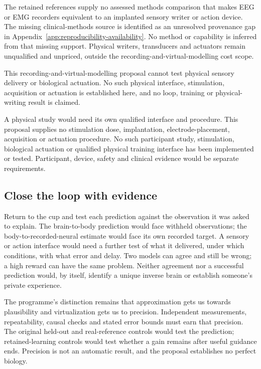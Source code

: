 The retained references supply no assessed methods comparison that makes EEG or EMG recorders equivalent to an implanted sensory writer or action device. The missing clinical-methods source is identified as an unresolved provenance gap in Appendix~\ref{app:reproducibility-availability}. No method or capability is inferred from that missing support. Physical writers, transducers and actuators remain unqualified and unpriced, outside the recording-and-virtual-modelling cost scope.

This recording-and-virtual-modelling proposal cannot test physical sensory
delivery or biological actuation. No such physical interface, stimulation,
acquisition or actuation is established here, and no loop, training or
physical-writing result is claimed.

A physical study would need its own qualified interface and procedure. This
proposal supplies no stimulation dose, implantation, electrode-placement,
acquisition or actuation procedure. No such participant study, stimulation, biological actuation or qualified physical training interface has been implemented or tested. Participant, device, safety and clinical evidence would be separate requirements.

\subsection{Close the loop with evidence}
Return to the cup and test each prediction against the observation it was
asked to explain. The brain-to-body prediction would face withheld observations;
the body-to-recorded-neural estimate would face its own recorded target.
A sensory or action interface would need a further test of what it delivered,
under which conditions, with what error and delay. Two models can agree and
still be wrong; a high reward can have the same problem. Neither agreement nor
a successful prediction would, by itself, identify a unique inverse brain or
establish someone's private experience.

The programme's distinction remains that approximation gets us towards
plausibility and virtualization gets us to precision. Independent measurements,
repeatability, causal checks and stated error bounds must earn that precision.
The original held-out and real-reference controls would test the prediction;
retained-learning controls would test whether a gain remains after useful
guidance ends. Precision is not an automatic result, and the proposal establishes
no perfect biology.

